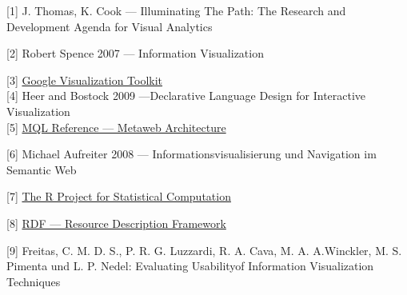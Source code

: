 \documentclass[runningheads]{llncs}
\begin{document}
[1] J. Thomas, K. Cook — Illuminating The Path: The Research and Development Agenda for Visual Analytics 

[2] Robert Spence 2007 — Information Visualization

[3]  \href{http://code.google.com/apis/visualization/documentation/reference.html}{Google Visualization Toolkit}\\


[4] Heer and Bostock 2009 —Declarative Language Design for Interactive Visualization\\


[5]  \href{http://www.freebase.com/docs/mql/ch02.html}{MQL Reference — Metaweb Architecture}

[6] Michael Aufreiter 2008 — Informationsvisualisierung und Navigation im Semantic Web

[7]  \href{http://www.r-project.org/}{The R Project for Statistical Computation}

[8]  \href{http://www.w3.org/RDF/}{RDF — Resource Description Framework}

[9] Freitas, C. M. D. S., P. R. G. Luzzardi, R. A. Cava, M. A. A.Winckler, M. S. Pimenta und L. P. Nedel: Evaluating Usabilityof Information Visualization Techniques
\end{document}
